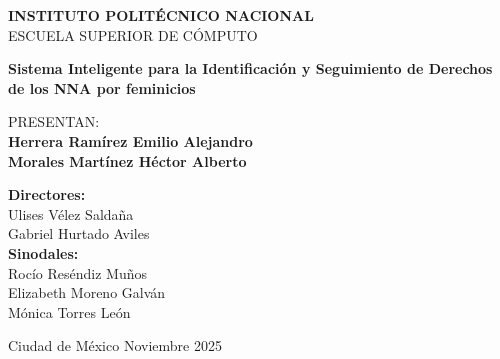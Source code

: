 \begin{titlepage}
    \centering
    
    
    \vspace{1cm}
    
    {\Large\bfseries INSTITUTO POLITÉCNICO NACIONAL}\\[0.5cm]
    {\large ESCUELA SUPERIOR DE CÓMPUTO}\\[2cm]
    \vspace{2cm}
    
    {\LARGE\bfseries Sistema Inteligente para la Identificación y Seguimiento de Derechos de los NNA por feminicios}\\[1.5cm]
    \vspace{2cm}
    
    {\large PRESENTAN:}\\[0.3cm]
    {\large\bfseries Herrera Ramírez Emilio Alejandro}\\
    {\large\bfseries Morales Martínez Héctor Alberto}\\[1.5cm]
    \vspace{1cm}
    
    \begin{flushleft}
    {\large\bfseries Directores:}\\
    {\large Ulises Vélez Saldaña}\\
    {\large Gabriel Hurtado Aviles}\\[0.5cm] 
    
    {\large\bfseries Sinodales:}\\
    {\large Rocío Reséndiz Muños}\\
    {\large Elizabeth Moreno Galván}\\
    {\large Mónica Torres León}\\
    \end{flushleft}
    
    \vfill
    
    {\large Ciudad de México \hspace{2cm} Noviembre 2025}
    
\end{titlepage}
